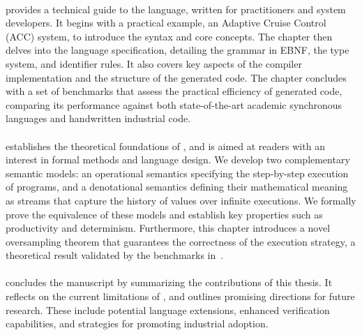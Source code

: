 \paragraph*{} provides a technical guide to the \GRust language, written for
practitioners and system developers. It begins with a practical example, an Adaptive Cruise Control
(ACC) system, to introduce the syntax and core concepts. The chapter then delves into the language
specification, detailing the grammar in EBNF, the type system, and identifier rules. It also covers
key aspects of the compiler implementation and the structure of the generated code. The chapter
concludes with a set of benchmarks that assess the practical efficiency of \GRust generated code,
comparing its performance against both state-of-the-art academic synchronous languages and
handwritten industrial \Rust code.

\paragraph*{} establishes the theoretical foundations of \GRust, and is aimed at
readers with an interest in formal methods and language design. We develop two complementary
semantic models: an operational semantics specifying the step-by-step execution of programs, and a
denotational semantics defining their mathematical meaning as streams that capture the history of
values over infinite executions. We formally prove the equivalence of these models and establish
key properties such as productivity and determinism. Furthermore, this chapter introduces a novel
oversampling theorem that guarantees the correctness of the execution strategy, a theoretical result
validated by the benchmarks in~.

\paragraph*{} concludes the manuscript by summarizing the contributions of this
thesis. It reflects on the current limitations of \GRust, and outlines promising directions for
future research. These include potential language extensions, enhanced verification capabilities,
and strategies for promoting industrial adoption.
